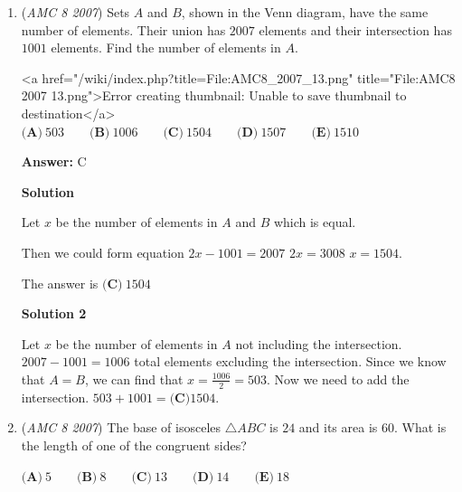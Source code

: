 \begin{enumerate}
 \textbf{Answer: }A



\textbf{Solution}

The six equilateral triangular extensions fit perfectly into the hexagon meaning the answer is $\boxed{\textbf{(A) }1:1}$




\textbf{Solution 2}

Split the hexagon into six small equilateral triangles. You will see that the six outer triangles can be folded to the hexagon, so the answer is $\boxed{\textbf{(A) }1:1}.$



	\item (\textit{AMC 8 2007}) Sets $A$ and $B$, shown in the Venn diagram, have the same number of elements.
Their union has $2007$ elements and their intersection has $1001$ elements. Find
the number of elements in $A$.


 <a href="/wiki/index.php?title=File:AMC8\_2007\_13.png" title="File:AMC8 2007 13.png">Error creating thumbnail: Unable to save thumbnail to destination</a>
$\textbf{(A)}\ 503 \qquad \textbf{(B)}\ 1006 \qquad \textbf{(C)}\ 1504 \qquad \textbf{(D)}\ 1507 \qquad \textbf{(E)}\ 1510$

 \textbf{Answer: }C



\textbf{Solution}

Let $x$ be the number of elements in $A$ and $B$ which is equal. 

 Then we could form equation $2x-1001 = 2007$
$2x = 3008$
$x = 1504$. 

 The answer is $\boxed{\textbf{(C)}\ 1504}$




\textbf{Solution 2}

Let $x$ be the number of elements in $A$ not including the intersection. $2007-1001=1006$ total elements excluding the intersection. Since we know that $A=B$, we can find that $x=\frac{1006}2=503$. Now we need to add the intersection. $503+1001=\boxed{\textbf{(C)} 1504}$.

 


	\item (\textit{AMC 8 2007}) The base of isosceles $\triangle ABC$ is $24$ and its area is $60$. What is the length of one
of the congruent sides?


 $\textbf{(A)}\ 5 \qquad \textbf{(B)}\ 8 \qquad \textbf{(C)}\ 13 \qquad \textbf{(D)}\ 14 \qquad \textbf{(E)}\ 18$


\end{enumerate}
